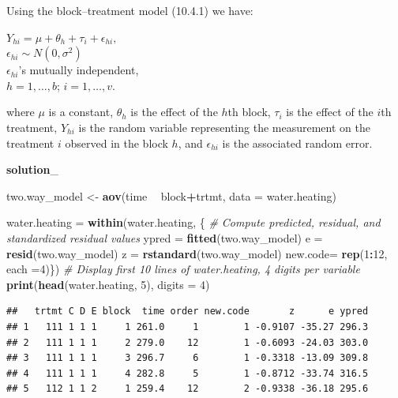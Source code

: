 \documentclass[12pt,]{article}
\newenvironment{Shaded}{\begin{snugshade}}{\end{snugshade}}
\newcommand{\KeywordTok}[1]{\textcolor[rgb]{0.13,0.29,0.53}{\textbf{#1}}}
\newcommand{\DataTypeTok}[1]{\textcolor[rgb]{0.13,0.29,0.53}{#1}}
\newcommand{\DecValTok}[1]{\textcolor[rgb]{0.00,0.00,0.81}{#1}}
\newcommand{\StringTok}[1]{\textcolor[rgb]{0.31,0.60,0.02}{#1}}
\newcommand{\CommentTok}[1]{\textcolor[rgb]{0.56,0.35,0.01}{\textit{#1}}}
\newcommand{\OperatorTok}[1]{\textcolor[rgb]{0.81,0.36,0.00}{\textbf{#1}}}
\newcommand{\NormalTok}[1]{#1}
\begin{document}
Using the block--treatment model (10.4.1) we have:

\begin{center}
$Y_{hi} = \mu + \theta_h + \tau_i + \epsilon_{hi},$\\
$\epsilon_{hi} \sim N(0,\sigma^2)$\\
$\epsilon_{hi}$'s mutually independent,\\
$h = 1,\ldots, b$; $i = 1, \ldots , v$.
\end{center}

where \(\mu\) is a constant, \(\theta_h\) is the effect of the \(h\)th
block, \(\tau_i\) is the effect of the \(i\)th treatment, \(Y_{hi}\) is
the random variable representing the measurement on the treatment \(i\)
observed in the block \(h\), and \(\epsilon_{hi}\) is the associated
random error.

\textbf{solution}\_

\begin{Shaded}
\begin{Highlighting}[]
\NormalTok{two.way_model <-}\StringTok{ }\KeywordTok{aov}\NormalTok{(time }\OperatorTok{~}\StringTok{ }\NormalTok{block}\OperatorTok{+}\NormalTok{trtmt, }\DataTypeTok{data =}\NormalTok{ water.heating)}

\NormalTok{water.heating =}\StringTok{ }\KeywordTok{within}\NormalTok{(water.heating, \{}
  \CommentTok{# Compute predicted, residual, and standardized residual values}
\NormalTok{  ypred =}\StringTok{ }\KeywordTok{fitted}\NormalTok{(two.way_model)}
\NormalTok{  e =}\StringTok{ }\KeywordTok{resid}\NormalTok{(two.way_model) }
\NormalTok{  z =}\StringTok{ }\KeywordTok{rstandard}\NormalTok{(two.way_model)}
\NormalTok{  new.code=}\StringTok{ }\KeywordTok{rep}\NormalTok{(}\DecValTok{1}\OperatorTok{:}\DecValTok{12}\NormalTok{, }\DataTypeTok{each =}\DecValTok{4}\NormalTok{)\})}
\CommentTok{# Display first 10 lines of water.heating, 4 digits per variable}
\KeywordTok{print}\NormalTok{(}\KeywordTok{head}\NormalTok{(water.heating, }\DecValTok{5}\NormalTok{), }\DataTypeTok{digits =} \DecValTok{4}\NormalTok{)}
\end{Highlighting}
\end{Shaded}

\begin{verbatim}
##   trtmt C D E block  time order new.code       z      e ypred
## 1   111 1 1 1     1 261.0     1        1 -0.9107 -35.27 296.3
## 2   111 1 1 1     2 279.0    12        1 -0.6093 -24.03 303.0
## 3   111 1 1 1     3 296.7     6        1 -0.3318 -13.09 309.8
## 4   111 1 1 1     4 282.8     5        1 -0.8712 -33.74 316.5
## 5   112 1 1 2     1 259.4    12        2 -0.9338 -36.18 295.6
\end{verbatim}
\end{document}

